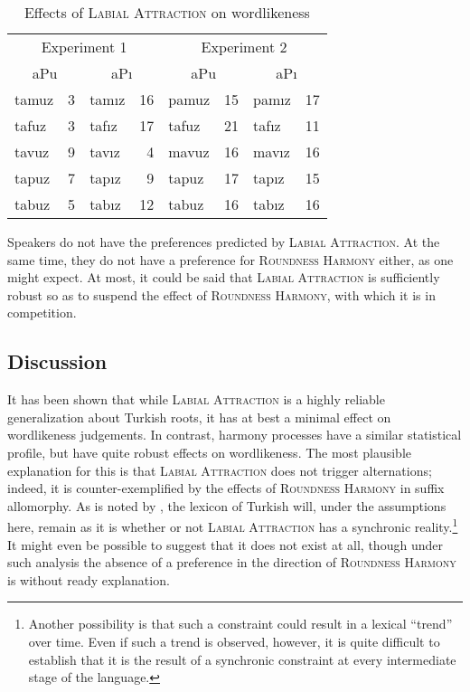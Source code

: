\begin{table}[t]
\centering
\begin{tabular}{lrlr|lrlr}
\toprule
\multicolumn{4}{c|}{Experiment 1} & \multicolumn{4}{c}{Experiment 2} \\
\multicolumn{2}{c}{aPu} & \multicolumn{2}{c|}{aPı} & \multicolumn{2}{c}{aPu} & \multicolumn{2}{c}{aPı} \\
\midrule
{tamuz} & 3 & {tamız} & 16 & {pamuz} & 15 & {pamız} & 17 \\
{tafuz} & 3 & {tafız} & 17 & {tafuz} & 21 & {tafız} & 11 \\
{tavuz} & 9 & {tavız} & 4  & {mavuz} & 16 & {mavız} & 16 \\
{tapuz} & 7 & {tapız} & 9  & {tapuz} & 17 & {tapız} & 15 \\
{tabuz} & 5 & {tabız} & 12 & {tabuz} & 16 & {tabız} & 16 \\
\bottomrule
\end{tabular}
\caption{Effects of \textsc{Labial Attraction} on wordlikeness \citep[from][]{Zimmer1969}}
\label{law}
\end{table}

Speakers do not have the preferences predicted by \textsc{Labial Attraction}.
At the same time, they do not have a preference for \textsc{Roundness Harmony} either, as one might expect.
At most, it could be said that \textsc{Labial Attraction} is sufficiently robust so as to suspend the effect of \textsc{Roundness Harmony}, with which it is in competition.

\subsection{Discussion}

It has been shown that while \textsc{Labial Attraction} is a highly reliable generalization about Turkish roots, it has at best a minimal effect on wordlikeness judgements.
In contrast, harmony processes have a similar statistical profile, but have quite robust effects on wordlikeness.
The most plausible explanation for this is that \textsc{Labial Attraction} does not trigger alternations; indeed, it is counter-exemplified by the effects of \textsc{Roundness Harmony} in suffix allomorphy.
As is noted by \citet[412f.]{Inkelas1997}, the lexicon of Turkish will, under the assumptions here, remain as it is whether or not \textsc{Labial Attraction} has a synchronic reality.\footnote{
    Another possibility is that such a constraint could result in a lexical ``trend'' over time.
    Even if such a trend is observed, however, it is quite difficult to establish that it is the result of a synchronic constraint at every intermediate stage of the language.}
It might even be possible to suggest that it does not exist at all, though under such analysis the absence of a preference in the direction of \textsc{Roundness Harmony} is without ready explanation.

